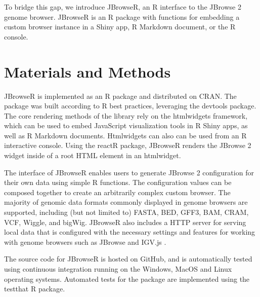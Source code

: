\documentclass{bioinfo}
\begin{document}
To bridge this gap, we introduce
JBrowseR, an R interface to the JBrowse 2 genome browser. JBrowseR is an R
package with functions for embedding a custom browser instance in a
Shiny app, R Markdown document, or the R console.

\section{Materials and Methods}

JBrowseR is implemented as an R package and distributed on CRAN. The
package was built according to R best practices, leveraging the devtools   %
package. The core rendering methods of the library rely on the
htmlwidgets framework, which can be used to embed JavaScript
visualization tools in R Shiny apps, as well as R Markdown documents.
Htmlwidgets can also can be used from an R interactive console. Using
the reactR package, JBrowseR renders the JBrowse 2 widget inside of a
root HTML element in an htmlwidget.

The interface of JBrowseR enables users to generate JBrowse 2
configuration for their own data using simple R functions. The
configuration values can be composed together to create an arbitrarily
complex custom browser. The majority of genomic data formats
commonly displayed in genome browsers are supported,
including (but not limited to) FASTA, BED, GFF3, BAM, CRAM, VCF, Wiggle, and bigWig.   %
JBrowseR also includes a
HTTP server for serving local data that is configured with the necessary
settings and features for working with genome browsers such as JBrowse
and IGV.js \citep{robinson2011integrative, robinson2017variant}.

The source code for JBrowseR is hosted on GitHub, and is automatically
tested using continuous integration running on the Windows, MacOS and
Linux operating systems. Automated tests for the package are implemented
using the testthat R package.
\end{document}
